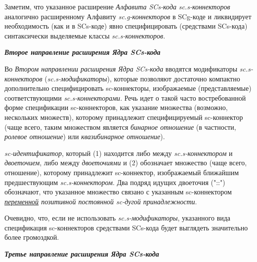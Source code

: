 Заметим, что указанное расширение \textit{Алфавита SCs-кода\scnsupergroupsign} \textit{sc.s-коннекторов} аналогично расширенному Алфавиту \textit{sc.g-коннекторов} в SCg-коде и ликвидирует необходимость (как и в SCs-коде) явно специфицировать (средствами SCs-кода) синтаксически выделяемые классы \textit{sc.s-коннекторов}.

\textbf{\textit{Второе направление расширения Ядра SCs-кода}}

Во \textit{Втором направлении расширения Ядра SCs-кода} вводятся модификаторы \textit{sc.s-коннекторов} (\textit{\mbox{sc.s-модификаторы}}), которые позволяют достаточно компактно дополнительно специфицировать \mbox{sc-коннекторы}, изображаемые (представляемые) соответствующими \textit{sc.s-коннекторами}. Речь идет о такой часто востребованной форме спецификации sc-коннекторов, как указание множества (возможно, нескольких множеств), которому принадлежит специфицируемый  sc-коннектор (чаще всего, таким множеством является \textit{бинарное отношение} (в частности, \textit{ролевое отношение}) или \textit{квазибинарное отношение}).

\begin{SCn}
\begin{scnindent}
\end{scnindent}	
\textit{sc-идентификатор}, который (1) находится либо между \textit{sc.s-коннектором} и \textit{двоеточием}, либо между \textit{двоеточиями} и (2) обозначает множество (чаще всего, отношение), которому принадлежит sc-коннектор, изображаемый ближайшим предшествующим \textit{sc.s-коннектором}. Два подряд идущих двоеточия ("::"{}) обозначают, что указанное множество связано с указанным sc-коннектором \textit{\uline{переменной} позитивной постоянной sc-дугой принадлежности}.
\end{SCn}

Очевидно, что, если не использовать \textit{sc.s-модификаторы}, указанного вида спецификация sc-коннекторов средствами SCs-кода будет выглядеть значительно более громоздкой.

\textbf{\textit{Третье направление расширения Ядра SCs-кода}}


